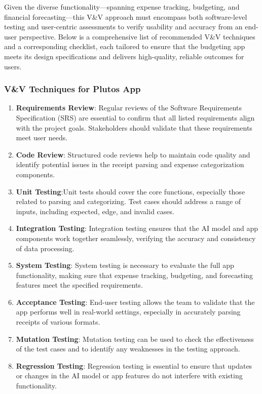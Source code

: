 \documentclass[12pt, titlepage]{article}
\begin{document}
Given the diverse functionality—spanning expense tracking, budgeting, and financial forecasting—this V\&V approach must encompass both software-level testing and user-centric assessments to verify usability and accuracy from an end-user perspective.
Below is a comprehensive list of recommended V\&V techniques and a corresponding checklist, each tailored to ensure that the budgeting app meets its design specifications and delivers high-quality, reliable outcomes for users.

\subsubsection{V\&V Techniques for Plutos App}
\noindent \begin{enumerate}
	\item \textbf{Requirements Review}: Regular reviews of the Software Requirements Specification (SRS) are essential to confirm that all listed requirements align with the project goals. Stakeholders should validate that these requirements meet user needs.
	\item \textbf{Code Review}: Structured code reviews help to maintain code quality and identify potential issues in the receipt parsing and expense categorization components.
	\item \textbf{Unit Testing}:Unit tests should cover the core functions, especially those related to parsing and categorizing. Test cases should address a range of inputs, including expected, edge, and invalid cases.
	\item \textbf{Integration Testing}: Integration testing ensures that the AI model and app components work together seamlessly, verifying the accuracy and consistency of data processing.
	\item \textbf{System Testing}: System testing is necessary to evaluate the full app functionality, making sure that expense tracking, budgeting, and forecasting features meet the specified requirements.
	\item \textbf{Acceptance Testing}: End-user testing allows the team to validate that the app performs well in real-world settings, especially in accurately parsing receipts of various formats.
	\item \textbf{Mutation Testing}: Mutation testing can be used to check the effectiveness of the test cases and to identify any weaknesses in the testing approach.
	\item \textbf{Regression Testing}: Regression testing is essential to ensure that updates or changes in the AI model or app features do not interfere with existing functionality.

\end{enumerate}
\end{document}
